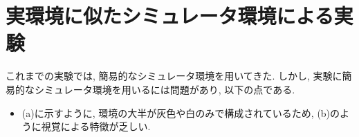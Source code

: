 
\section{実環境に似たシミュレータ環境による実験}
これまでの実験では, 簡易的なシミュレータ環境を用いてきた. しかし, 実験に簡易的なシミュレータ環境を用いるには問題があり, 以下の点である.

\begin{itemize}



  \item {} (a)に示すように, 環境の大半が灰色や白のみで構成されているため,  (b)のように視覚による特徴が乏しい. 
  

\end{itemize}
